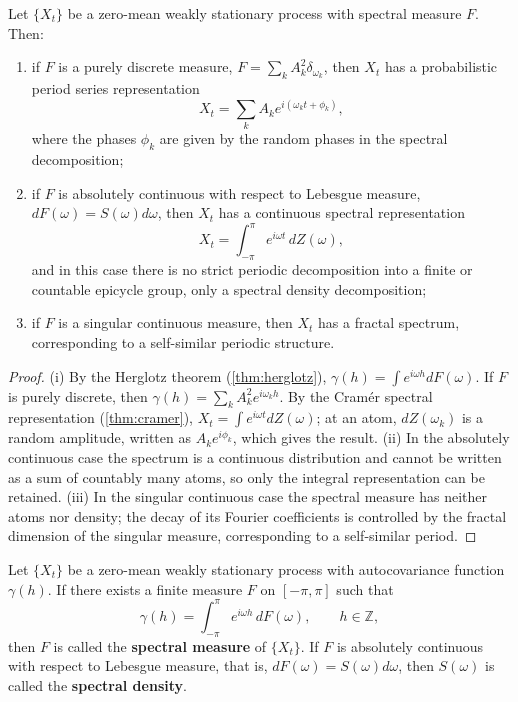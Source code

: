 \begin{theorem}\label{thm:prob_series_reconstruction}
Let $\{X_t\}$ be a zero-mean weakly stationary process with spectral measure $F$. Then:
\begin{enumerate}[label=(\roman*)]
    \item if $F$ is a purely discrete measure, $F=\sum_k A_k^2\delta_{\omega_k}$, then $X_t$ has a probabilistic period series representation
    \[
    X_t=\sum_k A_k e^{i(\omega_k t+\phi_k)},
    \]
    where the phases $\phi_k$ are given by the random phases in the spectral decomposition;
    \item if $F$ is absolutely continuous with respect to Lebesgue measure, $dF(\omega)=S(\omega)d\omega$, then $X_t$ has a continuous spectral representation
    \[
    X_t=\int_{-\pi}^{\pi}e^{i\omega t}\,dZ(\omega),
    \]
    and in this case there is no strict periodic decomposition into a finite or countable epicycle group, only a spectral density decomposition;
    \item if $F$ is a singular continuous measure, then $X_t$ has a fractal spectrum, corresponding to a self-similar periodic structure.
\end{enumerate}
\end{theorem}

\begin{proof}
(i) By the Herglotz theorem (\cref{thm:herglotz}), $\gamma(h)=\int e^{i\omega h}dF(\omega)$. If $F$ is purely discrete, then $\gamma(h)=\sum_k A_k^2 e^{i\omega_k h}$. By the Cramér spectral representation (\cref{thm:cramer}), $X_t=\int e^{i\omega t}dZ(\omega)$; at an atom, $dZ(\omega_k)$ is a random amplitude, written as $A_k e^{i\phi_k}$, which gives the result.
(ii) In the absolutely continuous case the spectrum is a continuous distribution and cannot be written as a sum of countably many atoms, so only the integral representation can be retained.
(iii) In the singular continuous case the spectral measure has neither atoms nor density; the decay of its Fourier coefficients is controlled by the fractal dimension of the singular measure, corresponding to a self-similar period.
\end{proof}

\begin{definition}\label{def:spectral_measure}
Let $\{X_t\}$ be a zero-mean weakly stationary process with autocovariance function $\gamma(h)$. If there exists a finite measure $F$ on $[-\pi,\pi]$ such that
\[
\gamma(h)=\int_{-\pi}^{\pi}e^{i\omega h}\,dF(\omega),\qquad h\in\mathbb Z,
\]
then $F$ is called the \textbf{spectral measure} of $\{X_t\}$. If $F$ is absolutely continuous with respect to Lebesgue measure, that is, $dF(\omega)=S(\omega)d\omega$, then $S(\omega)$ is called the \textbf{spectral density}.
\end{definition}

